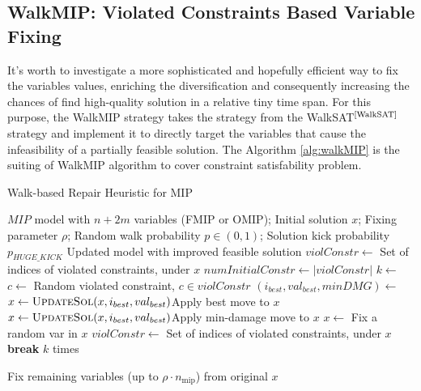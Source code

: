 \subsection{WalkMIP: Violated Constraints Based Variable Fixing}
It's worth to investigate a more sophisticated and hopefully efficient way to fix the variables values, enriching the diversification and consequently increasing the chances of find high-quality solution in a relative tiny time span. For this purpose, the WalkMIP strategy takes the strategy from the WalkSAT$^\text{\cite{WalkSAT}}$ strategy and implement it to directly target the variables that cause the infeasibility of a partially feasible solution. 
The Algorithm \ref{alg:walkMIP} is the suiting of WalkMIP algorithm to cover constraint satisfability problem.
\begin{algorithm}[H]
\caption{Walk-based Repair Heuristic for MIP}\label{alg:walkMIP}
\begin{algorithmic}[1]
\Require $MIP$ model with $n+2m$ variables (FMIP or OMIP); Initial solution $x$; Fixing parameter $\rho$; Random walk probability $p \in (0,1)$; Solution kick probability $p_{HUGE\_KICK}$
\Ensure Updated model with improved feasible solution
    \State $violConstr \gets$ Set of indices of violated constraints, under $x$
     $numInitialConstr \gets |violConstr|$\EndIf
     \Return \EndIf
     { }
    \EndIf
    \State $k \gets $
    \Repeat
        \State $c \gets $ Random violated constraint, $c \in violConstr$
        \State $(i_{best}, val_{best}, minDMG) \gets$ 
            \State $x \gets \Call{UpdateSol}{x,i_{best},val_{best}}$\Comment Apply best move to $x$
             \State $x \gets \Call{UpdateSol}{x,i_{best},val_{best}}$\Comment Apply min-damage move to $x$
        \Else 
            \State $x \gets $ Fix a random var in $x$
        \EndIf
        \State $violConstr \gets$ Set of indices of violated constraints, under $x$
         \textbf{break} \EndIf
    \Until $k$ times

        \State Fix remaining variables (up to $\rho \cdot n_{\text{mip}}$) from original $x$
    \EndIf
\EndFunction


\end{algorithmic}
\end{algorithm}
